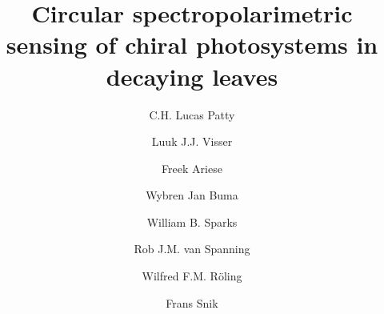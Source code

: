 \documentclass[review]{elsarticle}
\begin{document}
\begin{frontmatter}

\title{Circular spectropolarimetric sensing of chiral photosystems in decaying leaves}


\author[mymainaddress]{C.H. Lucas Patty}

\author[a]{Luuk J.J. Visser}
\author[b]{Freek Ariese}
\author[c]{Wybren Jan Buma}
\author[d]{William B. Sparks}
\author[mymainaddress]{Rob J.M. van Spanning}
\author[mymainaddress]{Wilfred F.M. R{\"o}ling \textsuperscript{\textdied}}
\author[a]{Frans Snik}

\address[mymainaddress]{Molecular Cell Biology, Amsterdam Institute for Molecules, Medicines and Systems, VU Amsterdam, De Boelelaan 1108, 1081 HZ Amsterdam, The Netherlands}
\address[a]{Leiden Observatory, Leiden University, P.O. Box 9513, 2300 RA Leiden, The Netherlands}
\address[b] {LaserLaB, VU Amsterdam, De Boelelaan 1083, 1081 HV Amsterdam, The Netherlands}
\address[c] {HIMS, Photonics group, University of Amsterdam, Science Park 904, 1098 XH Amsterdam, The Netherlands}
\address[d] {Space Telescope Science Institute, 3700 San Martin Drive, Baltimore, MD 21218, USA}



\end{frontmatter}
\end{document}
